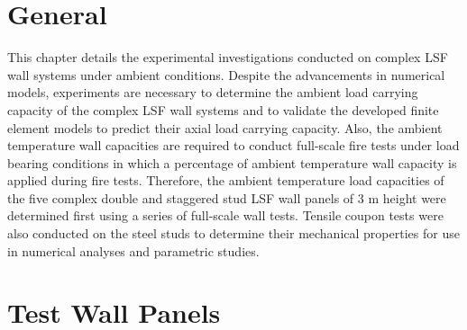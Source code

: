 \section{General}

This chapter details the experimental investigations conducted on complex LSF wall systems under ambient conditions. Despite the advancements in numerical models, experiments are necessary to determine the ambient load carrying capacity of the complex LSF wall systems and to validate the developed finite element models to predict their axial load carrying capacity. Also, the ambient temperature wall capacities are required to conduct full-scale fire tests under load bearing conditions in which a percentage of ambient temperature wall capacity is applied during fire tests. Therefore, the ambient temperature load capacities of the five complex double and staggered stud LSF wall panels of 3 m height were determined first using a series of full-scale wall tests. Tensile coupon tests were also conducted on the steel studs to determine their mechanical properties for use in numerical analyses and parametric studies.  

\section{Test Wall Panels}

